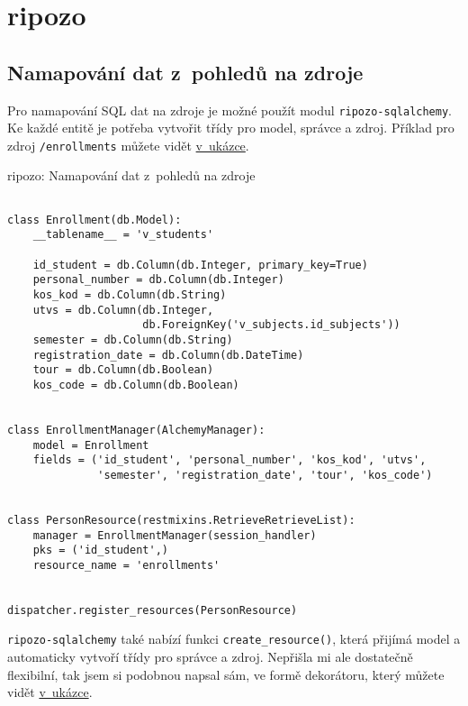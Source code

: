 \section{ripozo}\label{ripozo}

\subsection{Namapování dat z~pohledů na zdroje}\label{namapovuxe1nuxed-dat-z-pohledux16f-na-zdroje}

Pro namapování SQL dat na zdroje je možné použít modul \verb!ripozo-sqlalchemy!. Ke každé entitě je potřeba vytvořit třídy pro model, správce a zdroj. Příklad pro zdroj \verb!/enrollments! můžete vidět \protect\hyperlink{code:ripozo:mapping}{v~ukázce}.

\begin{listing}[htbp]
\caption{{\label{code:ripozo:mapping}ripozo: Namapování dat z~pohledů na zdroje}}
\begin{verbatim}

class Enrollment(db.Model):
    __tablename__ = 'v_students'

    id_student = db.Column(db.Integer, primary_key=True)
    personal_number = db.Column(db.Integer)
    kos_kod = db.Column(db.String)
    utvs = db.Column(db.Integer,
                     db.ForeignKey('v_subjects.id_subjects'))
    semester = db.Column(db.String)
    registration_date = db.Column(db.DateTime)
    tour = db.Column(db.Boolean)
    kos_code = db.Column(db.Boolean)


class EnrollmentManager(AlchemyManager):
    model = Enrollment
    fields = ('id_student', 'personal_number', 'kos_kod', 'utvs',
              'semester', 'registration_date', 'tour', 'kos_code')


class PersonResource(restmixins.RetrieveRetrieveList):
    manager = EnrollmentManager(session_handler)
    pks = ('id_student',)
    resource_name = 'enrollments'


dispatcher.register_resources(PersonResource)
\end{verbatim}
\end{listing}

\verb!ripozo-sqlalchemy! také nabízí funkci \verb!create_resource()!, která přijímá model a automaticky vytvoří třídy pro správce a zdroj. Nepřišla mi ale dostatečně flexibilní, tak jsem si podobnou napsal sám, ve formě dekorátoru, který můžete vidět \protect\hyperlink{code:ripozo:register}{v~ukázce}.

